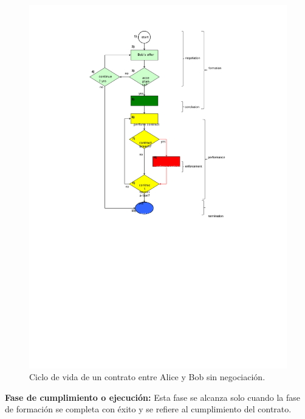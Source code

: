 \documentclass[12pt]{report} %
\begin{document}
\begin{figure}
\centering
  \includegraphics[height=0.90\textheight] {ciclodevidacont.pdf}
\caption{Ciclo de vida de un contrato entre Alice y Bob sin negociación.} 
\label{fig:lifecyclecivilcontnobargain}
\end{figure}



\textbf{Fase de cumplimiento o ejecución:} Esta fase se alcanza solo cuando la fase de formación se completa con éxito y se refiere al cumplimiento del contrato.
\end{document}
